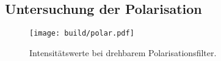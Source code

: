 \subsection{Untersuchung der Polarisation}

\begin{figure}
    \centering
    \texttt{[image: build/polar.pdf]}
    \caption{Intensitätswerte bei drehbarem Polarisationsfilter.}
    \label{fig:pol}
\end{figure}

%
